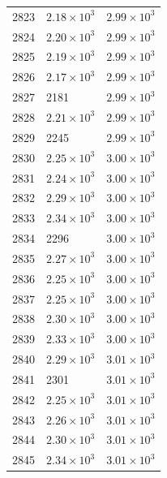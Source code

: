 \begin{table}[H]
\begin{tabular}{lll}
2823 & $\displaystyle 2.18 \times 10^{3}$ & $\displaystyle 2.99 \times 10^{3}$ \\
2824 & $\displaystyle 2.20 \times 10^{3}$ & $\displaystyle 2.99 \times 10^{3}$ \\
2825 & $\displaystyle 2.19 \times 10^{3}$ & $\displaystyle 2.99 \times 10^{3}$ \\
2826 & $\displaystyle 2.17 \times 10^{3}$ & $\displaystyle 2.99 \times 10^{3}$ \\
2827 & 2181 & $\displaystyle 2.99 \times 10^{3}$ \\
2828 & $\displaystyle 2.21 \times 10^{3}$ & $\displaystyle 2.99 \times 10^{3}$ \\
2829 & 2245 & $\displaystyle 2.99 \times 10^{3}$ \\
2830 & $\displaystyle 2.25 \times 10^{3}$ & $\displaystyle 3.00 \times 10^{3}$ \\
2831 & $\displaystyle 2.24 \times 10^{3}$ & $\displaystyle 3.00 \times 10^{3}$ \\
2832 & $\displaystyle 2.29 \times 10^{3}$ & $\displaystyle 3.00 \times 10^{3}$ \\
2833 & $\displaystyle 2.34 \times 10^{3}$ & $\displaystyle 3.00 \times 10^{3}$ \\
2834 & 2296 & $\displaystyle 3.00 \times 10^{3}$ \\
2835 & $\displaystyle 2.27 \times 10^{3}$ & $\displaystyle 3.00 \times 10^{3}$ \\
2836 & $\displaystyle 2.25 \times 10^{3}$ & $\displaystyle 3.00 \times 10^{3}$ \\
2837 & $\displaystyle 2.25 \times 10^{3}$ & $\displaystyle 3.00 \times 10^{3}$ \\
2838 & $\displaystyle 2.30 \times 10^{3}$ & $\displaystyle 3.00 \times 10^{3}$ \\
2839 & $\displaystyle 2.33 \times 10^{3}$ & $\displaystyle 3.00 \times 10^{3}$ \\
2840 & $\displaystyle 2.29 \times 10^{3}$ & $\displaystyle 3.01 \times 10^{3}$ \\
2841 & 2301 & $\displaystyle 3.01 \times 10^{3}$ \\
2842 & $\displaystyle 2.25 \times 10^{3}$ & $\displaystyle 3.01 \times 10^{3}$ \\
2843 & $\displaystyle 2.26 \times 10^{3}$ & $\displaystyle 3.01 \times 10^{3}$ \\
2844 & $\displaystyle 2.30 \times 10^{3}$ & $\displaystyle 3.01 \times 10^{3}$ \\
2845 & $\displaystyle 2.34 \times 10^{3}$ & $\displaystyle 3.01 \times 10^{3}$ \\

\end{tabular}
\end{table}
